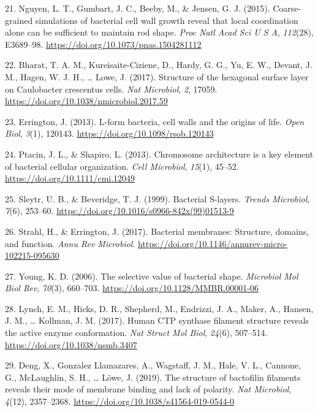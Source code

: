\documentclass[]{tufte-book}
\begin{document}
\leavevmode\hypertarget{ref-nguyen2015}{}%
21. Nguyen, L. T., Gumbart, J. C., Beeby, M., \& Jensen, G. J. (2015). Coarse-grained simulations of bacterial cell wall growth reveal that local coordination alone can be sufficient to maintain rod shape. \emph{Proc Natl Acad Sci U S A}, \emph{112}(28), E3689--98. \url{https://doi.org/10.1073/pnas.1504281112}

\leavevmode\hypertarget{ref-bharat2017}{}%
22. Bharat, T. A. M., Kureisaite-Ciziene, D., Hardy, G. G., Yu, E. W., Devant, J. M., Hagen, W. J. H., \ldots{} Lowe, J. (2017). Structure of the hexagonal surface layer on Caulobacter crescentus cells. \emph{Nat Microbiol}, \emph{2}, 17059. \url{https://doi.org/10.1038/nmicrobiol.2017.59}

\leavevmode\hypertarget{ref-errington2013}{}%
23. Errington, J. (2013). L-form bacteria, cell walls and the origins of life. \emph{Open Biol}, \emph{3}(1), 120143. \url{https://doi.org/10.1098/rsob.120143}

\leavevmode\hypertarget{ref-ptacin2013}{}%
24. Ptacin, J. L., \& Shapiro, L. (2013). Chromosome architecture is a key element of bacterial cellular organization. \emph{Cell Microbiol}, \emph{15}(1), 45--52. \url{https://doi.org/10.1111/cmi.12049}

\leavevmode\hypertarget{ref-sleytr1999}{}%
25. Sleytr, U. B., \& Beveridge, T. J. (1999). Bacterial S-layers. \emph{Trends Microbiol}, \emph{7}(6), 253--60. \url{https://doi.org/10.1016/s0966-842x(99)01513-9}

\leavevmode\hypertarget{ref-strahl2017}{}%
26. Strahl, H., \& Errington, J. (2017). Bacterial membranes: Structure, domains, and function. \emph{Annu Rev Microbiol}. \url{https://doi.org/10.1146/annurev-micro-102215-095630}

\leavevmode\hypertarget{ref-young2006}{}%
27. Young, K. D. (2006). The selective value of bacterial shape. \emph{Microbiol Mol Biol Rev}, \emph{70}(3), 660--703. \url{https://doi.org/10.1128/MMBR.00001-06}

\leavevmode\hypertarget{ref-lynch2017}{}%
28. Lynch, E. M., Hicks, D. R., Shepherd, M., Endrizzi, J. A., Maker, A., Hansen, J. M., \ldots{} Kollman, J. M. (2017). Human CTP synthase filament structure reveals the active enzyme conformation. \emph{Nat Struct Mol Biol}, \emph{24}(6), 507--514. \url{https://doi.org/10.1038/nsmb.3407}

\leavevmode\hypertarget{ref-deng2019}{}%
29. Deng, X., Gonzalez Llamazares, A., Wagstaff, J. M., Hale, V. L., Cannone, G., McLaughlin, S. H., \ldots{} Löwe, J. (2019). The structure of bactofilin filaments reveals their mode of membrane binding and lack of polarity. \emph{Nat Microbiol}, \emph{4}(12), 2357--2368. \url{https://doi.org/10.1038/s41564-019-0544-0}
\end{document}
